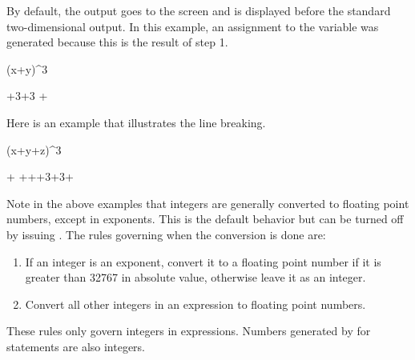 \begin{xtc}
\begin{xtccomment}
By default, the output goes to the screen and is displayed
before the standard \Language{} two-dimensional output.
In this example, an
assignment to the variable  was generated because this is
the result of step 1.
\end{xtccomment}
\begin{spadsrc}
(x+y)^3 
\end{spadsrc}
\begin{TeXOutput}
\begin{fricasmath}{1}
+3\TIMES {}\TIMES {}+3\TIMES %
\TIMES {}+%
\end{fricasmath}
\end{TeXOutput}
\end{xtc}
\begin{xtc}
\begin{xtccomment}
Here is an example that illustrates the line breaking.
\end{xtccomment}
\begin{spadsrc}
(x+y+z)^3 
\end{spadsrc}
\begin{TeXOutput}
\begin{fricasmath}{2}
+\TIMES %
+\TIMES {}++3\TIMES {}\TIMES {}+3\TIMES {}\TIMES {}+%
\end{fricasmath}
\end{TeXOutput}
\end{xtc}

Note in the above examples that integers are generally converted to
floating point numbers, except in exponents.
This is the default behavior but can be turned off by issuing
.
The rules governing when the conversion is done are:
\begin{enumerate}
\item If an integer is an exponent, convert it to a floating point
number if it is greater than 32767 in absolute value, otherwise leave it
as an integer.
\item Convert all other integers in an expression to floating
point numbers.
\end{enumerate}
These rules only govern integers in expressions.
Numbers generated by \Language{} for  statements are also
integers.

